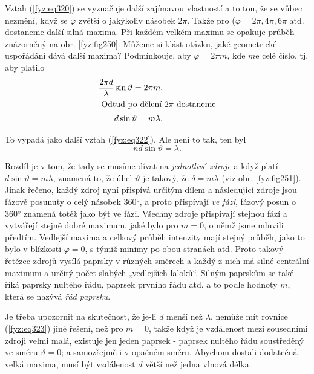     Vztah (\ref{fyz:eq320}) se vyznačuje další zajímavou vlastností a to tou, že se vůbec nezmění, 
    když se \(\varphi\) zvětší o jakýkoliv násobek \(2\pi\). Takže pro (\(\varphi = 2\pi, 4\pi, 
    6\pi\) atd. dostaneme další silná maxima. Při každém velkém maximu se opakuje průběh znázorněný 
    na obr. \ref{fyz:fig250}. Můžeme si klást otázku, jaké geometrické uspořádání dává další 
    maxima? Podmínkouje, aby \(\varphi=2\pi m\), kde \(m\)e celé číslo, tj. aby platilo
    \begin{align}
      \frac{2\pi d}{\lambda}\sin\vartheta = 2\pi m.         \nonumber \\
      \shortintertext{ Odtud po dělení \(2\pi\) dostaneme}  
      d\sin\vartheta = m\lambda.                            \label{fyz:eq323}
    \end{align}

    To vypadá jako další vztah (\ref{fyz:eq322}). Ale není to tak, ten byl 
    \begin{equation*}
      nd\sin\vartheta = \lambda.
    \end{equation*}
    
    Rozdíl je v tom, že tady se musíme dívat na \emph{jednotlivé zdroje} a když platí 
    \(d\sin\vartheta = m\lambda\), znamená to, že úhel \(\vartheta\) je takový, že \(\delta= 
    m\lambda\) (viz obr. \ref{fyz:fig251}). Jinak řečeno, každý zdroj nyní přispívá určitým dílem a 
    následující zdroje jsou fázově posunuty o celý násobek \ang{360}, a proto přispívají 
    \emph{ve fázi}, fázový posun o \ang{360} znamená totéž jako být ve fázi. Všechny zdroje 
    přispívají stejnou fází a vytvářejí stejně dobré maximum, jaké bylo pro \(m = 0\), o němž jsme 
    mluvili předtím. Vedlejší maxima a celkový průběh intenzity mají stejný průběh, jako to bylo v 
    blízkosti \(\varphi = 0\), s týmiž minimy po obou stranách atd. Proto takový řetězec zdrojů 
    vysílá paprsky v různých směrech a každý z nich má silné centrální maximum a určitý počet 
    slabých „vedlejších laloků“. Silným paprskům se také říká paprsky nultého řádu, paprsek prvního 
    řádu atd. a to podle hodnoty \(m\), která se nazývá \emph{řád paprsku}.
    
    Je třeba upozornit na skutečnost, že je-li \(d\) menší než \(\lambda\), nemůže mít rovnice 
    (\ref{fyz:eq323}) jiné řešení, než pro \(m = 0\), takže když je vzdálenost mezi sousedními 
    zdroji velmi malá, existuje jen jeden paprsek - paprsek nultého řádu soustředěný ve směru 
    \(\vartheta = 0\); a samozřejmě i v opačném směru. Abychom dostali dodatečná velká maxima, musí 
    být vzdálenost \(d\) větší než jedna vlnová délka.
    
